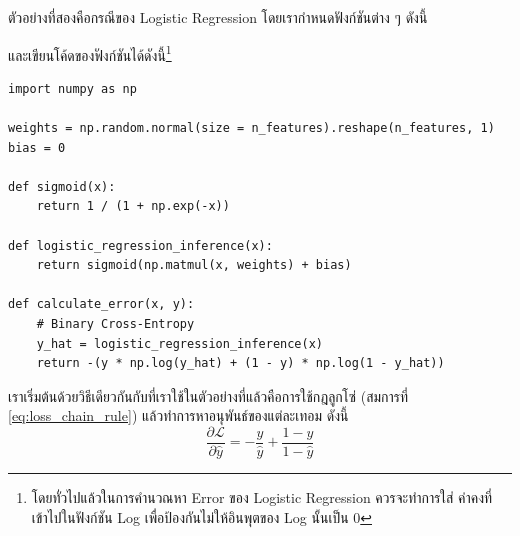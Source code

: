 ตัวอย่างที่สองคือกรณีของ Logistic Regression โดยเรากำหนดฟังก์ชันต่าง ๆ ดังนี้


\vspace{1em}

\noindent และเขียนโค้ดของฟังก์ชันได้ดังนี้\footnote{โดยทั่วไปแล้วในการคำนวณหา Error ของ Logistic Regression ควรจะทำการใส่    ค่าคงที่เข้าไปในฟังก์ชัน Log เพื่อป้องกันไม่ให้อินพุตของ Log นั้นเป็น 0}

\begin{lstlisting}[style=MyPython]
import numpy as np

weights = np.random.normal(size = n_features).reshape(n_features, 1)
bias = 0

def sigmoid(x):
    return 1 / (1 + np.exp(-x))

def logistic_regression_inference(x):
    return sigmoid(np.matmul(x, weights) + bias)

def calculate_error(x, y):
    # Binary Cross-Entropy
    y_hat = logistic_regression_inference(x)
    return -(y * np.log(y_hat) + (1 - y) * np.log(1 - y_hat))
\end{lstlisting}

\vspace{1em}

เราเริ่มต้นด้วยวิธีเดียวกันกับที่เราใช้ในตัวอย่างที่แล้วคือการใช้กฎลูกโซ่ (สมการที่ \eqref{eq:loss_chain_rule}) แล้วทำการหาอนุพันธ์ของแต่ละเทอม ดังนี้
%
\begin{equation}
    \frac{\partial \mathcal{L}}{\partial \hat{y}} = -\frac{y}{\hat{y}} + \frac{1-y}{1-\hat{y}}
\end{equation}

